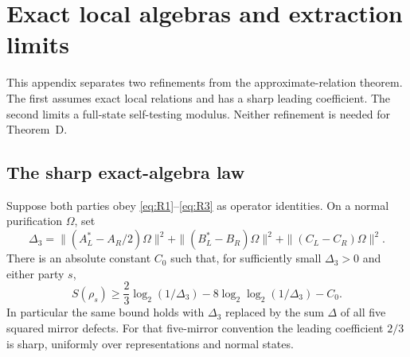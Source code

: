 \section{Exact local algebras and extraction limits}\label{sec:exact-law}
This appendix separates two refinements from the approximate-relation theorem. The first assumes exact local relations and has a sharp leading coefficient. The second limits a full-state self-testing modulus. Neither refinement is needed for Theorem~D.

\subsection{The sharp exact-algebra law}
\begin{theorem}\label{thm:exact-law}
Suppose both parties obey \eqref{eq:R1}--\eqref{eq:R3} as operator identities. On a normal purification $\Omega$, set
\[
 \Delta_3=\|(A_L^*-A_R/2)\Omega\|^2
 +\|(B_L^*-B_R)\Omega\|^2+\|(C_L-C_R)\Omega\|^2.
\]
There is an absolute constant $C_0$ such that, for sufficiently small $\Delta_3>0$ and either party $s$,
\[
 S(\rho_s)\ge\frac23\log_2(1/\Delta_3)
       -8\log_2\log_2(1/\Delta_3)-C_0.
\]
In particular the same bound holds with $\Delta_3$ replaced by the sum $\Delta$ of all five squared mirror defects. For that five-mirror convention the leading coefficient $2/3$ is sharp, uniformly over representations and normal states.
\end{theorem}

